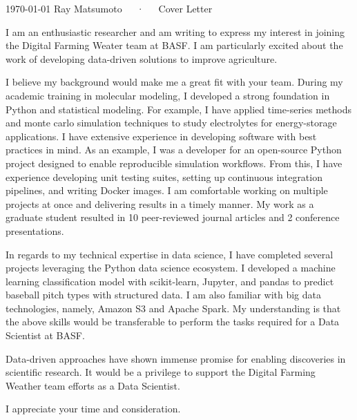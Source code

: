\documentclass[11pt, a4paper]{awesome-cv}
\begin{document}
\makecvheader[R]

\makecvfooter
  {\today}
  {Ray Matsumoto~~~·~~~Cover Letter}
  {}

\makelettertitle

\begin{cvletter}

I am an enthusiastic researcher and am writing to express my interest in
    joining the Digital Farming Weater team at BASF.  
    I am particularly excited about the work of developing data-driven solutions
    to improve agriculture.

    I believe my background would make me a great fit with your team.  During my
    academic training in molecular modeling, I developed a strong foundation in
    Python and statistical modeling.
    For example, I have applied time-series methods and monte carlo simulation
    techniques to study electrolytes for energy-storage applications.
    I have extensive experience in developing software with best practices in
    mind.
    As an example, I was a developer for an open-source Python project designed
    to enable reproducible simulation workflows.  From this, I have experience
    developing unit testing suites, setting up continuous integration pipelines,
    and writing Docker images.
    I am comfortable working on multiple projects at once and delivering results
    in a timely manner.
    My work as a graduate student resulted in 10 peer-reviewed journal articles and 2
    conference presentations.

    In regards to my technical expertise in data science, I have completed
    several projects leveraging the Python data science ecosystem.  I developed
    a machine learning classification model with scikit-learn, Jupyter, and
    pandas to predict baseball pitch types with structured data.  I am also
    familiar with big data technologies, namely, Amazon S3 and Apache Spark.
    My understanding is that the above skills would be transferable to perform
    the tasks required for a Data Scientist at BASF.


    Data-driven approaches have shown immense promise for enabling discoveries
    in scientific research.  It would be a privilege to support the
    Digital Farming Weather team efforts as a Data Scientist.

    I appreciate your time and consideration.


\end{cvletter}


\makeletterclosing
\end{document}

